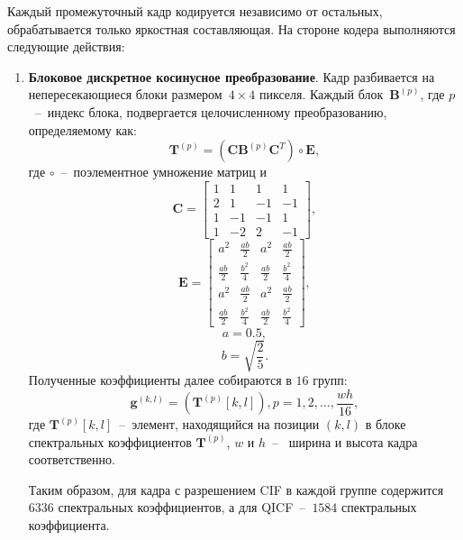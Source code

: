 Каждый промежуточный кадр кодируется независимо от остальных, обрабатывается только яркостная составляющая. На стороне кодера выполняются следующие действия:
\begin{enumerate}
  \item\label{DVCEncoder:DCT} \textbf{Блоковое дискретное косинусное преобразование}. Кадр разбивается на непересекающиеся блоки размером~$4\times4$ пикселя. Каждый блок~$\mathbf{B}^{(p)}$, где $p$~--~индекс блока, подвергается целочисленному преобразованию, определяемому как:
  \begin{equation*}
  \mathbf{T}^{(p)} = (\mathbf{C} \mathbf{B}^{(p)} \mathbf{C}^T) \circ \mathbf{E},
  \end{equation*}
  где $\circ$~--~поэлементное умножение матриц и
  \begin{equation*}
  \mathbf{C} = \begin{bmatrix}
  1 & 1 & 1 & 1 \\
  2 & 1 & -1 & -1 \\
  1 & -1 & -1 & 1 \\
  1 & -2 & 2 & -1
  \end{bmatrix},
  \end{equation*}
  \begin{equation*}
  \mathbf{E} = \begin{bmatrix}
  a^2 & \frac{ab}{2} & a^2 & \frac{ab}{2} \\
  \frac{ab}{2} & \frac{b^2}{4} & \frac{ab}{2} & \frac{b^2}{4} \\
  a^2 & \frac{ab}{2} & a^2 & \frac{ab}{2} \\
  \frac{ab}{2} & \frac{b^2}{4} & \frac{ab}{2} & \frac{b^2}{4}
  \end{bmatrix},
  \end{equation*}
  \begin{equation*}
  a = 0.5,
  \end{equation*}
  \begin{equation*}
  b = \sqrt{\frac{2}{5}}.
  \end{equation*}
  Полученные коэффициенты далее собираются в $16$ групп:
  \begin{equation*}
  \mathbf{g}^{(k,l)} = \left(\mathbf{T}^{(p)}[k,l]\right), p=1,2,\ldots,\frac{wh}{16},
  \end{equation*}
  где $\mathbf{T}^{(p)}[k,l]$~--~элемент, находящийся на позиции $(k,l)$ в блоке спектральных коэффициентов $\mathbf{T}^{(p)}$, $w$ и $h$~--~ ширина и высота кадра соответственно.
  
  Таким образом, для кадра с разрешением CIF в каждой группе содержится $6336$ спектральных коэффициентов, а для QICF~--~$1584$ спектральных коэффициента.
  

\end{enumerate}
